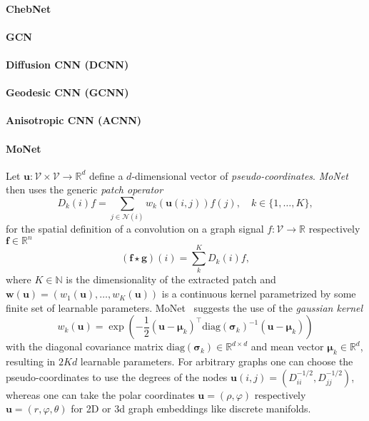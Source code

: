 \documentclass[pdftex,10pt,a4paper]{scrartcl}
\begin{document}
\paragraph{ChebNet}

\paragraph{GCN}

\paragraph{Diffusion CNN (DCNN)}

\paragraph{Geodesic CNN (GCNN)}

\paragraph{Anisotropic CNN (ACNN)}

\paragraph{MoNet}

Let $\mathbf{u} \colon \mathcal{V} \times \mathcal{V} \to \mathbb{R}^d$ define a $d$-dimensional vector of \emph{pseudo-coordinates}.
\emph{MoNet}~\cite{Monti2016} then uses the generic \emph{patch operator}
\begin{equation*}
  D_k(i)f = \sum_{j \in \mathcal{N}(i)} w_k(\mathbf{u}(i, j)) f(j), \quad k \in \{ 1, \ldots, K \},
\end{equation*}
for the spatial definition of a convolution on a graph signal $f \colon \mathcal{V} \to \mathbb{R}$ respectively $\mathbf{f} \in \mathbb{R}^n$
\begin{equation*}
  (\mathbf{f} \star \mathbf{g})(i) = \sum_k^K D_k(i)f,
\end{equation*}
where $K \in \mathbb{N}$ is the dimensionality of the extracted patch and $\mathbf{w}(\mathbf{u}) = (w_1(\mathbf{u}), \ldots, w_K(\mathbf{u}))$ is a continuous kernel parametrized by some finite set of learnable parameters.
MoNet~\cite{Monti2016} suggests the use of the \emph{gaussian kernel}
\begin{equation*}
  w_k(\mathbf{u}) = \exp \left(-\frac{1}{2} {(\mathbf{u} - \boldsymbol{\mu}_k)}^{\top} {\mathrm{diag}(\boldsymbol{\sigma}_k)}^{-1} (\mathbf{u} - \boldsymbol{\mu}_k) \right)
\end{equation*}
with the diagonal covariance matrix $\mathrm{diag}(\boldsymbol{\sigma}_k) \in \mathbb{R}^{d \times d}$ and mean vector $\boldsymbol{\mu}_k \in \mathbb{R}^d$, resulting in $2Kd$ learnable parameters.
For arbitrary graphs one can choose the pseudo-coordinates to use the degrees of the nodes $\mathbf{u}(i,j) = \left( D_{ii}^{-1/2}, D_{jj}^{-1/2} \right)$, whereas one can take the polar coordinates $\mathbf{u} = (\rho, \varphi)$ respectively $\mathbf{u} = (r, \varphi, \theta)$ for 2D or 3d graph embeddings like discrete manifolds.
\end{document}
